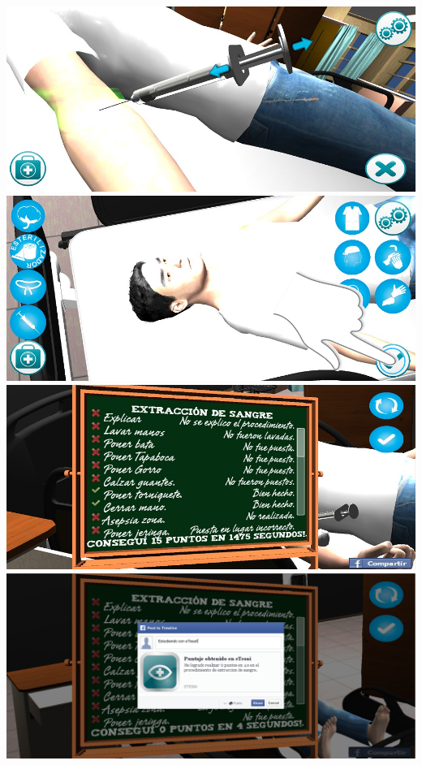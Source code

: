 \begin{frame}
\begin{overprint}
 \includegraphics[width=\textwidth]{../solucion/images/hemocultivo_jeringa_ampliada.jpg} 
 \includegraphics[width=\textwidth]{imagenes/flujo/flujo6.png} 
 \includegraphics[width=\textwidth]{../solucion/images/resultado_hemocultivo.jpg}
 \includegraphics[width=\textwidth]{imagenes/flujo/flujo18.png} 

\end{overprint}
\end{frame}
